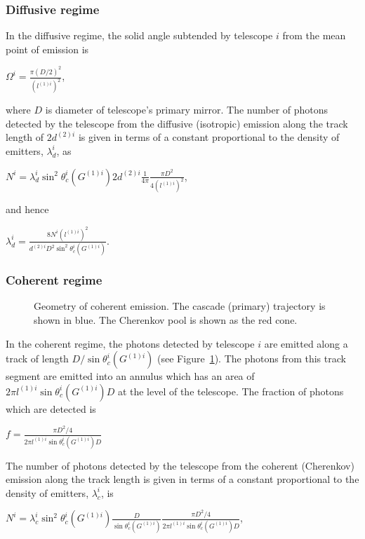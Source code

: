 \documentclass[letterpaper]{article}
\begin{document}
\subsubsection*{Diffusive regime}

In the diffusive regime, the solid angle subtended by telescope $i$
from the mean point of emission is

$\displaystyle \Omega^i = \frac{\pi(D/2)^2}{(l^{(1)i})^2}$,

where $D$ is diameter of telescope's primary mirror. 
The number of photons detected by the telescope from the diffusive
(isotropic) emission along the track length of $2d^{(2)i}$ is given in
terms of a constant proportional to the density of emitters,
$\lambda_d^i$, as

$\displaystyle N^i = 
\lambda_d^i\sin^2\theta_c^i(G^{(1)i})
2d^{(2)i}\frac{1}{4\pi}\frac{\pi D^2}{4(l^{(1)i})^2}$,

and hence

$\displaystyle \lambda_d^i = 
\frac{8N^i(l^{(1)i})^2}{d^{(2)i}D^2\sin^2\theta_c^i(G^{(1)i})}$.

\subsubsection*{Coherent regime}

\begin{figure}[t]
\centerline{}
\caption{\label{Fig::Coherent} Geometry of coherent emission. The cascade 
(primary) trajectory is shown in blue. The Cherenkov pool is shown as
the red cone.}
\end{figure}

In the coherent regime, the photons detected by telescope $i$ are
emitted along a track of length $D/\sin\theta_c^i(G^{(1)i})$ (see
Figure~\ref{Fig::Coherent}). The photons from this track segment are
emitted into an annulus which has an area of
$2\pi l^{(1)i}\sin\theta_c^i(G^{(1)i})D$ at the level of the telescope.
The fraction of photons which are detected is

$\displaystyle f = \frac{\pi D^2/4}{2\pi l^{(1)i}\sin\theta_c^i(G^{(1)i})D}$

The number of photons detected by the telescope from the coherent
(Cherenkov) emission along the track length is given in terms
of a constant proportional to the density of emitters, $\lambda_c^i$,
is

$\displaystyle N^i = 
\lambda_c^i\sin^2\theta_c^i(G^{(1)i}) \frac{D}{\sin\theta_c^i(G^{(1)i})} 
\frac{\pi D^2/4}{2\pi l^{(1)i}\sin\theta_c^i(G^{(1)i})D}$,
\end{document}
